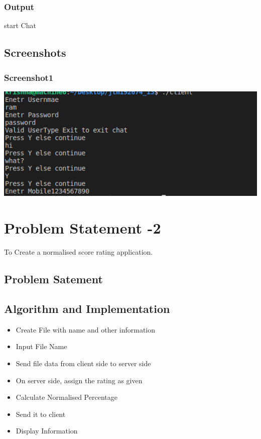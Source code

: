 \documentclass[12pt]{article}
\begin{document}
\subsubsection{Output}
start Chat
\subsection{Screenshots}
\subsubsection{Screenshot1}
\includegraphics[width=\linewidth]{lab13_c.png}
\clearpage
\newpage
\section{Problem Statement -2}
 To Create a normalised score rating application.
 
  \subsection{Problem Satement}
  
  \subsection{Algorithm and Implementation}
  \begin{itemize}
  \item Create File with name and other information
  \item Input File Name
  \item Send file data from client side to server side
  \item On server side, assign the rating as given
  \item Calculate Normalised Percentage
  \item Send it to client
  \item Display Information
  \end{itemize}
  
\end{document}
